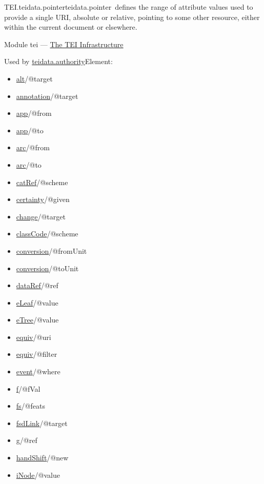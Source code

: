 \begin{reflist}
\item[]\begin{specHead}{TEI.teidata.pointer}{teidata.pointer} defines the range of attribute values used to provide a single URI, absolute or relative, pointing to some other resource, either within the current document or elsewhere.\end{specHead} 
    \item[{Module}]
  tei — \hyperref[ST]{The TEI Infrastructure}
    \item[{Used by}]
  \hyperref[TEI.teidata.authority]{teidata.authority}Element: \begin{itemize}
\item \hyperref[TEI.alt]{alt}/@target
\item \hyperref[TEI.annotation]{annotation}/@target
\item \hyperref[TEI.app]{app}/@from
\item \hyperref[TEI.app]{app}/@to
\item \hyperref[TEI.arc]{arc}/@from
\item \hyperref[TEI.arc]{arc}/@to
\item \hyperref[TEI.catRef]{catRef}/@scheme
\item \hyperref[TEI.certainty]{certainty}/@given
\item \hyperref[TEI.change]{change}/@target
\item \hyperref[TEI.classCode]{classCode}/@scheme
\item \hyperref[TEI.conversion]{conversion}/@fromUnit
\item \hyperref[TEI.conversion]{conversion}/@toUnit
\item \hyperref[TEI.dataRef]{dataRef}/@ref
\item \hyperref[TEI.eLeaf]{eLeaf}/@value
\item \hyperref[TEI.eTree]{eTree}/@value
\item \hyperref[TEI.equiv]{equiv}/@uri
\item \hyperref[TEI.equiv]{equiv}/@filter
\item \hyperref[TEI.event]{event}/@where
\item \hyperref[TEI.f]{f}/@fVal
\item \hyperref[TEI.fs]{fs}/@feats
\item \hyperref[TEI.fsdLink]{fsdLink}/@target
\item \hyperref[TEI.g]{g}/@ref
\item \hyperref[TEI.handShift]{handShift}/@new
\item \hyperref[TEI.iNode]{iNode}/@value

\end{itemize}
\end{reflist}
